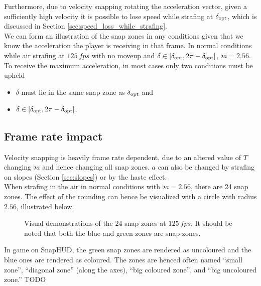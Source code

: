 Furthermore, due to velocity snapping rotating the acceleration vector, given a sufficiently high velocity it is possible to lose speed while strafing at $\delta_{\operatorname{opt}}$, which is discussed in Section \ref{sec:speed_loss_while_strafing}.\\

We can form an illustration of the snap zones in any conditions given that we know the acceleration the player is receiving in that frame.
In normal conditions while air strafing at $\qty{125}{fps}$ with no moveup and $\delta \in [\delta_{\operatorname{opt}}, 2\pi - \delta_{\operatorname{opt}}]$, $\flat{a} = 2.56$.\\

To receive the maximum acceleration, in most cases only two conditions must be upheld
\begin{itemize}
\item
$\delta$ must lie in the same snap zone as $\delta_{\operatorname{opt}}$ and
\item
$\delta \in [\delta_{\operatorname{opt}}, 2\pi - \delta_{\operatorname{opt}}]$.
\end{itemize}


\subsection{Frame rate impact}
\label{sec:snap_frame_rate}
Velocity snapping is heavily frame rate dependent, due to an altered value of $T$ changing $\flat{a}$ and hence changing all snap zones.
$a$ can also be changed by strafing on slopes (Section \ref{sec:slopes}) or by the haste effect.\\
When strafing in the air in normal conditions with $\flat{a} = 2.56$, there are 24 snap zones.
The effect of the rounding can hence be visualized with a circle with radius $2.56$, illustrated below.
\begin{figure}[H]
	\centering
	\begin{subfigure}[t]{.5\textwidth}
		\centering
		\setlength\figureheight{5.5cm}
		\setlength\figurewidth{5.5cm}
		\caption{}
		\label{fig:snap_zones}
	\end{subfigure}%
	\begin{subfigure}[t]{.5\textwidth}
		\centering
		\setlength\figureheight{5.5cm}
		\setlength\figurewidth{5.5cm}
		\caption{}
		\label{fig:snap_areas}
	\end{subfigure}
	\caption{Visual demonstrations of the $24$ snap zones at $\qty{125}{fps}$. It should be noted that both the blue and green zones are snap zones.}
\end{figure}
In game on SnapHUD, the green snap zones are rendered as uncoloured and the blue ones are rendered as coloured. The zones are henced often named ``small zone'', ``diagonal zone'' (along the axes), ``big coloured zone'', and ``big uncoloured zone.''
TODO


